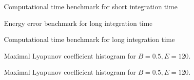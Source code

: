\documentclass{beamer}
\begin{document}

\begin{frame}
	\begin{figure}
		
		\caption{Computational time benchmark for short integration time}
	\end{figure}
\end{frame}


\begin{frame}
	\begin{figure}
		
		\caption{Energy error benchmark for long integration time}
	\end{figure}
\end{frame}


\begin{frame}
	\begin{figure}
		
		\caption{Computational time benchmark for long integration time}
	\end{figure}
\end{frame}


\begin{frame}
	\begin{figure}
		
		\caption{Maximal Lyapunov coefficient histogram for \(B=0.5, E=120\).}
	\end{figure}
\end{frame}


\begin{frame}
	\begin{figure}
		
		\caption{Maximal Lyapunov coefficient histogram for \(B=0.5, E=120\).}
	\end{figure}
\end{frame}

\end{document}
